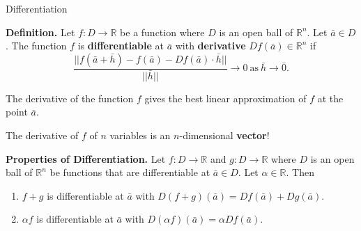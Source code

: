 \documentclass{beamer}
\begin{document}
    \begin{frame}[t]{Differentiation}
        \begin{block}
            \par \textbf{Definition.} Let $f: D \to \mathbb{R}$ be a function where $D$ is an open ball of $\mathbb{R}^n$. Let $\bar{a} \in D$. The function $f$ is \textbf{differentiable} at $\bar{a}$ with \textbf{derivative} $Df(\bar{a}) \in \mathbb{R}^n$ if 
            \begin{equation*}
                \dfrac{|| f(\bar{a} + \bar{h}) - f(\bar{a}) - D f(\bar{a}) \cdot \bar{h}||}{||\bar{h}||} \to 0\ \text{as} \ \bar{h} \to \bar{0} .
            \end{equation*}
        \end{block}


        \par The derivative of the function $f$ gives the best linear approximation of $f$ at the point $\bar{a}$.

        \par The derivative of $f$ of $n$ variables is an $n$-dimensional \textbf{vector}!

        \begin{block}
            \par \textbf{Properties of Differentiation.} Let $f: D \to \mathbb{R}$ and $g: D \to \mathbb{R}$ where $D$ is an open ball of $\mathbb{R}^n$ be functions that are differentiable at $\bar{a} \in D$. Let $\alpha \in \mathbb{R}$. Then 
            \begin{enumerate}
                \item $f + g$ is differentiable at $\bar{a}$ with $D(f+g) (\bar{a}) = Df(\bar{a}) + Dg (\bar{a})$.
                \item $\alpha f$ is differentiable at $\bar{a}$ with $D(\alpha f) (\bar{a}) = \alpha D f(\bar{a})$.
            \end{enumerate}
        \end{block}
    \end{frame}
\end{document}
